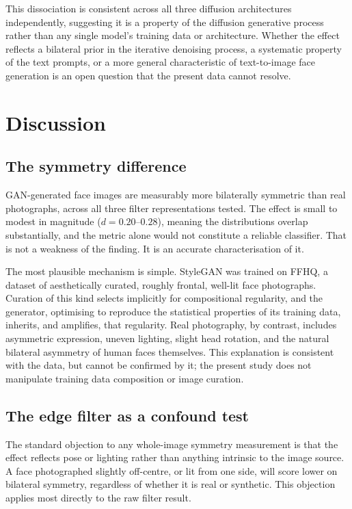 \documentclass[11pt,a4paper]{article}
\begin{document}
This dissociation is consistent across all three diffusion architectures
independently, suggesting it is a property of the diffusion generative process
rather than any single model's training data or architecture. Whether the effect
reflects a bilateral prior in the iterative denoising process, a systematic
property of the text prompts, or a more general characteristic of text-to-image
face generation is an open question that the present data cannot resolve.

\section{Discussion}

\subsection{The symmetry difference}

GAN-generated face images are measurably more bilaterally symmetric than real
photographs, across all three filter representations tested. The effect is small
to modest in magnitude ($d = 0.20$--$0.28$), meaning the distributions overlap
substantially, and the metric alone would not constitute a reliable classifier.
That is not a weakness of the finding. It is an accurate characterisation of it.

The most plausible mechanism is simple. StyleGAN was trained on FFHQ, a
dataset of aesthetically curated, roughly frontal, well-lit face photographs.
Curation of this kind selects implicitly for compositional regularity, and the
generator, optimising to reproduce the statistical properties of its training
data, inherits, and amplifies, that regularity. Real photography, by contrast,
includes asymmetric expression, uneven lighting, slight head rotation, and the
natural bilateral asymmetry of human faces themselves. This explanation is
consistent with the data, but cannot be confirmed by it; the present study does
not manipulate training data composition or image curation.

\subsection{The edge filter as a confound test}

The standard objection to any whole-image symmetry measurement is that the
effect reflects pose or lighting rather than anything intrinsic to the image
source. A face photographed slightly off-centre, or lit from one side, will
score lower on bilateral symmetry, regardless of whether it is real or synthetic.
This objection applies most directly to the raw filter result.
\end{document}
